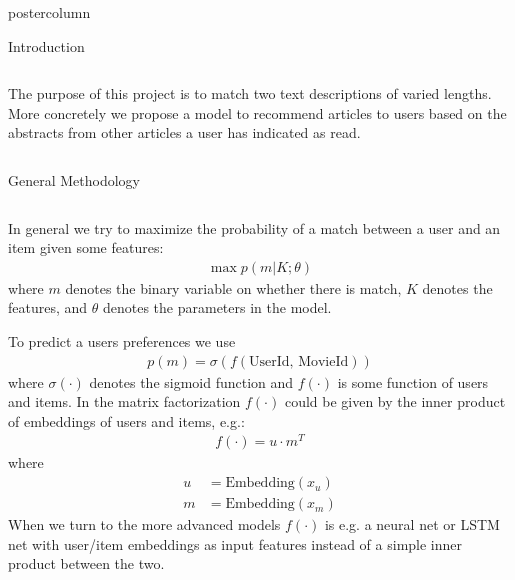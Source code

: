 \documentclass[final,hyperref={pdfpagelabels=false}]{beamer}
\begin{document}
\begin{frame}
\begin{columns}
\begin{column}{.49\paperwidth}
\begin{beamercolorbox}[center,wd=\textwidth]{postercolumn}
\begin{minipage}[T]{.99\textwidth}
{\begin{block}{Introduction}
\begin{columns}
\begin{column}{1\textwidth}
\begin{minipage}[t]{0.98\textwidth}
{The purpose of this project is to match two text descriptions of varied lengths. More concretely we propose a model to recommend articles to users based on the abstracts from other articles a user has indicated as read.
\vspace{0.5cm}
}



\end{minipage} \hspace{1cm}


      
\end{column}
 \end{columns}
 \end{block}
 \vfill



\begin{block}{General Methodology}
 \begin{columns}
 \begin{column}{1\textwidth}


\centering
\begin{minipage}[t]{0.98\textwidth}

\footnotesize{
In general we try to maximize the probability of a match between a user and an item given some features: 
%
\begin{align*}
\max p (m | K; \theta)
\end{align*}
%
where $m$ denotes the binary variable on whether there is match, $K$ denotes the features, and $\theta$ denotes the parameters in the model.

To predict a users preferences we use
%
%
\begin{align*}
    p(m) = \sigma( f ( \text{UserId, MovieId}) ) 
\end{align*}
%
where $\sigma( \cdot )$ denotes the sigmoid function and $f( \cdot )$ is some function of users and items. In the matrix factorization $f(\cdot)$ could be given by the inner product of embeddings of users and items, e.g.:
%
%
\begin{align*}
    f(\cdot) = u \cdot m^T
\end{align*}
%
%
where
%
%
\begin{align*}
    u &= \text{Embedding}(x_u) \\
    m &= \text{Embedding}(x_m) 
\end{align*}
%
%
When we turn to the more advanced models $f(\cdot)$ is e.g. a neural net or LSTM net with user/item embeddings as input features instead of a simple inner product between the two.
\vspace{0.5cm}
}




\end{minipage}
\end{column}
\end{columns}
\end{block}}
\end{minipage}
\end{beamercolorbox}
\end{column}
\end{columns}
\end{frame}
\end{document}
